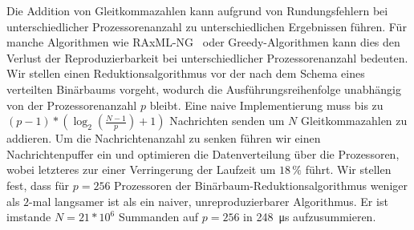 
\Abstract
Die Addition von Gleitkommazahlen kann aufgrund von Rundungsfehlern bei unterschiedlicher Prozessorenanzahl zu unterschiedlichen Ergebnissen führen.
Für manche Algorithmen wie RAxML-NG~\cite{kozlov_raxml-ng_2019} oder Greedy-Algorithmen kann dies den Verlust der Reproduzierbarkeit bei unterschiedlicher Prozessorenanzahl bedeuten.
Wir stellen einen Reduktionsalgorithmus vor der nach dem Schema eines verteilten Binärbaums vorgeht, wodurch die Ausführungsreihenfolge unabhängig von der Prozessorenanzahl $p$ bleibt.
Eine naive Implementierung muss bis zu $(p - 1) * (\log_2 (\tfrac{N-1}{p}) + 1)$ Nachrichten senden um $N$ Gleitkommazahlen zu addieren.
Um die Nachrichtenanzahl zu senken führen wir einen Nachrichtenpuffer ein und optimieren die Datenverteilung über die Prozessoren, wobei letzteres zur einer Verringerung der Laufzeit um $18\,\%$ führt.
Wir stellen fest, dass für $p=256$ Prozessoren der Binärbaum-Reduktionsalgorithmus weniger als $2$-mal langsamer ist als ein naiver, unreproduzierbarer Algorithmus.
Er ist imstande $N=21*10^6$ Summanden auf $p=256$ in \SI{248}{\micro\second} aufzusummieren.